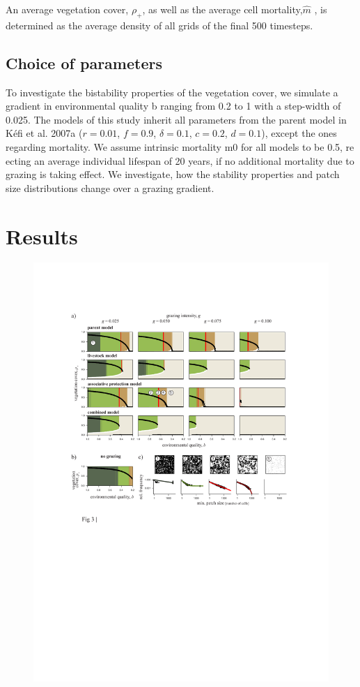 An average vegetation cover, $\rho_+$, as well as the average cell mortality,$\hat{m}$ , is determined as the average density of all grids of the final 500 timesteps.


\subsection{Choice of parameters}

To investigate the bistability properties of the vegetation cover, we simulate a gradient in environmental quality b ranging from 0.2 to 1 with a step-width of 0.025. The models of this study inherit all parameters from the parent model in K\'efi et al. 2007a ($r = 0.01$, $f = 0.9$, $\delta = 0.1$, $c = 0.2$, $d = 0.1$), except the ones regarding mortality. We assume intrinsic mortality m0 for all models to be 0.5, re
ecting an average individual lifespan of 20 years, if no additional mortality due to grazing is taking effect. We investigate, how the stability properties and patch size distributions change over a grazing gradient.



\section{Results}

\newpage

\begin{figure}[h]%
\includegraphics[width=\columnwidth]{figures/fig3.pdf}%
\caption{}%
\label{}%
\end{figure}


